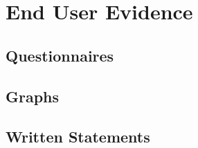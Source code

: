 \section{End User Evidence}

\subsection{Questionnaires}

\subsection{Graphs}

\subsection{Written Statements}





